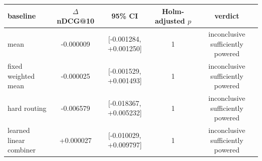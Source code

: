 \begin{tabular}{lcccc}
\toprule
baseline & $\Delta$ nDCG@10 & 95\% CI & Holm-adjusted $p$ & verdict \\
\midrule
mean & -0.000009 & [-0.001284, +0.001250] & 1 & inconclusive sufficiently powered \\
fixed weighted mean & -0.000025 & [-0.001529, +0.001493] & 1 & inconclusive sufficiently powered \\
hard routing & -0.006579 & [-0.018367, +0.005232] & 1 & inconclusive sufficiently powered \\
learned linear combiner & +0.000027 & [-0.010029, +0.009797] & 1 & inconclusive sufficiently powered \\
\bottomrule
\end{tabular}
